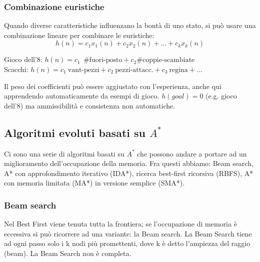 \subsubsection{Combinazione euristiche}
Quando diverse caratteristiche influenzano la bontà di uno stato, si può usare una combinazione lineare per combinare le euristiche:
$$h(n) = c_1 x_1(n) + c_2x_2(n) + \dots + c_k x_k(n)$$
\begin{example}
    Gioco dell'8: $h(n) = c_1 \:\: \#\text{fuori-posto} + c_2 \#\text{coppie-scambiate}$\\
    Scacchi: $h(n) = c_1 \:\text{vant-pezzi} + c_2 \:\text{pezzi-attacc.} + c_3 \:\text{regina} + \dots$
\end{example}
\hspace{-15pt}Il peso dei coefficienti può essere aggiustato con l’esperienza, anche qui apprendendo automaticamente da esempi di gioco.
$h(goal) = 0$ (e.g. gioco dell’8) ma ammissibilità e consistenza non automatiche.

\subsection{Algoritmi evoluti basati su $A^*$}
Ci sono una serie di algoritmi basati su $A^*$ che possono andare a portare ad un miglioramento dell'occupazione della memoria.
Fra questi abbiamo: Beam search, A* con approfondimento iterativo (IDA*), ricerca best-first ricorsiva (RBFS), A* con memoria limitata (MA*) in versione semplice (SMA*).

\subsubsection{Beam search}
Nel Best First viene tenuta tutta la frontiera; se l’occupazione di memoria è eccessiva si può ricorrere ad una variante: la Beam search.
La Beam Search tiene ad ogni passo solo i k nodi più promettenti, dove k è detto l’ampiezza del raggio
(beam). La Beam Search non è completa.

